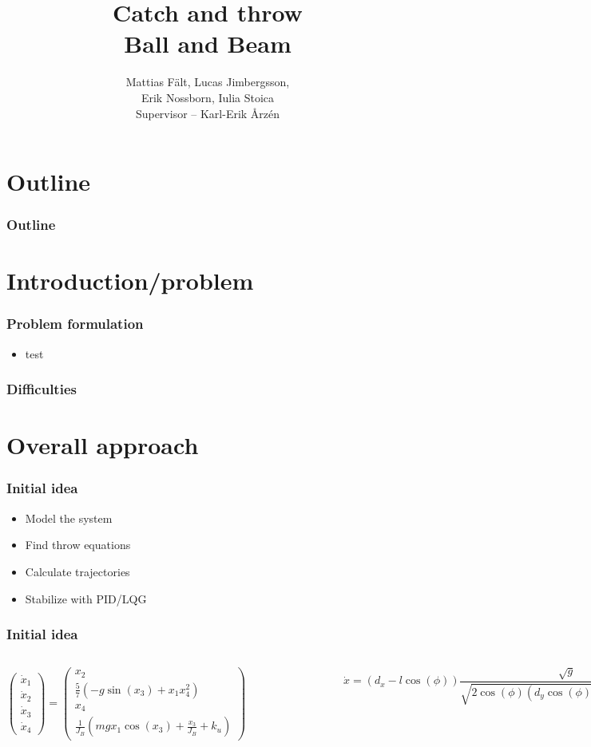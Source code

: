 \documentclass[
compress]
{beamer}
\title[Catch and Throw]{Catch and throw\\Ball and Beam}
\author[]{Mattias Fält, Lucas Jimbergsson,\\Erik Nossborn, Iulia Stoica\\\vspace{1em}Supervisor -- Karl-Erik Årz\'{e}n}
\begin{document}
\frame{\titlepage}

\section*{Outline}

\frame{\partpage}

\frame
{
  \frametitle{Outline}
  \tableofcontents[part=1]%
}

\section{Introduction/problem}
\begin{frame}
\frametitle{Problem formulation}
\begin{itemize}
\item test
\end{itemize}
\end{frame}


\begin{frame}
\frametitle{Difficulties}

\end{frame}

\section{Overall approach}
\begin{frame}
\frametitle{Initial idea}
\begin{itemize}
\item Model the system
\item Find throw equations
\item Calculate trajectories
\item Stabilize with PID/LQG
\end{itemize}
\end{frame}

\begin{frame}

\frametitle{Initial idea}
\begin{columns}
\column{150pt}
\[
\begin{pmatrix}\dot{x}_{1}\\
\dot{x}_{2}\\
\dot{x}_{3}\\
\dot{x}_{4}
\end{pmatrix}=\begin{pmatrix}x_{2}\\
\frac{5}{7}\left(-g\sin(x_{3})+x_{1}x_{4}^{2}\right)\\
x_{4}\\
\frac{1}{J_B}(mgx_{1}\cos(x_3)+\frac{x_3}{J_B}+k_{u})
\end{pmatrix}
\]
\begin{figure}
\centering
\scalebox{0.5}{}
\end{figure}
\column{150pt}
\[
\dot{x}=\left(d_{x}-l\cos(\phi)\right)\frac{\sqrt{g}}{\sqrt{2\cos(\phi)\left(d_{y}\cos(\phi)+d_{x}\sin(\phi)\right)}}.
\]
\end{columns}
\end{frame}
\end{document}
